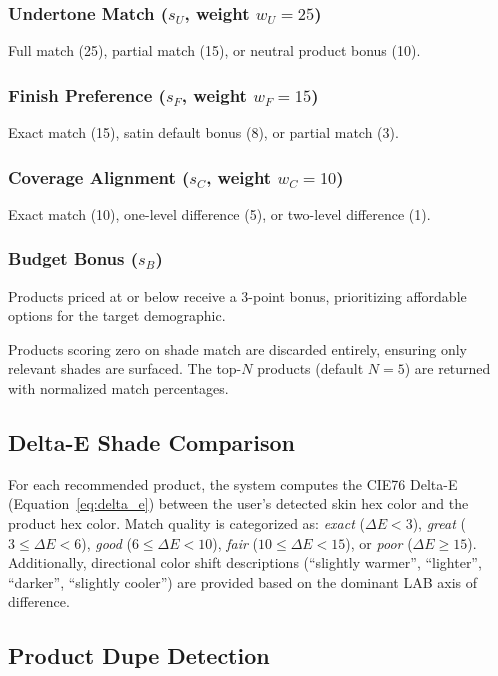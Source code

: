 \documentclass[conference]{IEEEtran}
\begin{document}
\subsubsection{Undertone Match ($s_U$, weight $w_U = 25$)}
Full match (25), partial match (15), or neutral product bonus (10).

\subsubsection{Finish Preference ($s_F$, weight $w_F = 15$)}
Exact match (15), satin default bonus (8), or partial match (3).

\subsubsection{Coverage Alignment ($s_C$, weight $w_C = 10$)}
Exact match (10), one-level difference (5), or two-level difference (1).

\subsubsection{Budget Bonus ($s_B$)}
Products priced at or below  receive a 3-point bonus, prioritizing affordable options for the target demographic.

Products scoring zero on shade match are discarded entirely, ensuring only relevant shades are surfaced. The top-$N$ products (default $N=5$) are returned with normalized match percentages.

\subsection{Delta-E Shade Comparison}

For each recommended product, the system computes the CIE76 Delta-E (Equation~\ref{eq:delta_e}) between the user's detected skin hex color and the product hex color. Match quality is categorized as: \textit{exact} ($\Delta E < 3$), \textit{great} ($3 \leq \Delta E < 6$), \textit{good} ($6 \leq \Delta E < 10$), \textit{fair} ($10 \leq \Delta E < 15$), or \textit{poor} ($\Delta E \geq 15$). Additionally, directional color shift descriptions (``slightly warmer'', ``lighter'', ``darker'', ``slightly cooler'') are provided based on the dominant LAB axis of difference.

\subsection{Product Dupe Detection}
\end{document}
